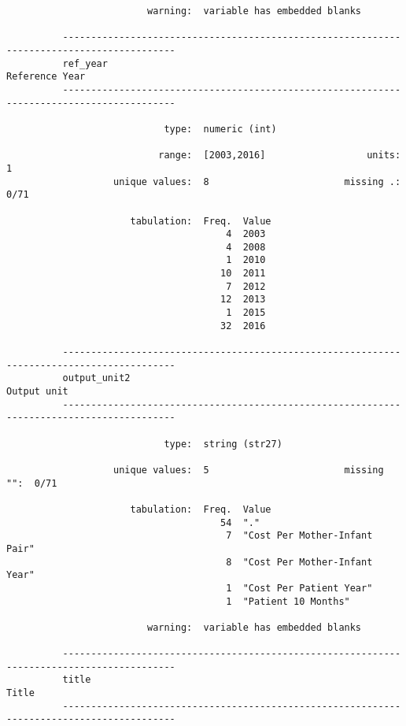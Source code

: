 \documentclass{article}
\begin{document}
\begin{verbatim}
                         warning:  variable has embedded blanks
          
          ------------------------------------------------------------------------------------------
          ref_year                                                                    Reference Year
          ------------------------------------------------------------------------------------------
          
                            type:  numeric (int)
          
                           range:  [2003,2016]                  units:  1
                   unique values:  8                        missing .:  0/71
          
                      tabulation:  Freq.  Value
                                       4  2003
                                       4  2008
                                       1  2010
                                      10  2011
                                       7  2012
                                      12  2013
                                       1  2015
                                      32  2016
          
          ------------------------------------------------------------------------------------------
          output_unit2                                                                   Output unit
          ------------------------------------------------------------------------------------------
          
                            type:  string (str27)
          
                   unique values:  5                        missing "":  0/71
          
                      tabulation:  Freq.  Value
                                      54  "."
                                       7  "Cost Per Mother-Infant Pair"
                                       8  "Cost Per Mother-Infant Year"
                                       1  "Cost Per Patient Year"
                                       1  "Patient 10 Months"
          
                         warning:  variable has embedded blanks
          
          ------------------------------------------------------------------------------------------
          title                                                                                Title
          ------------------------------------------------------------------------------------------
          

\end{verbatim}
\end{document}
